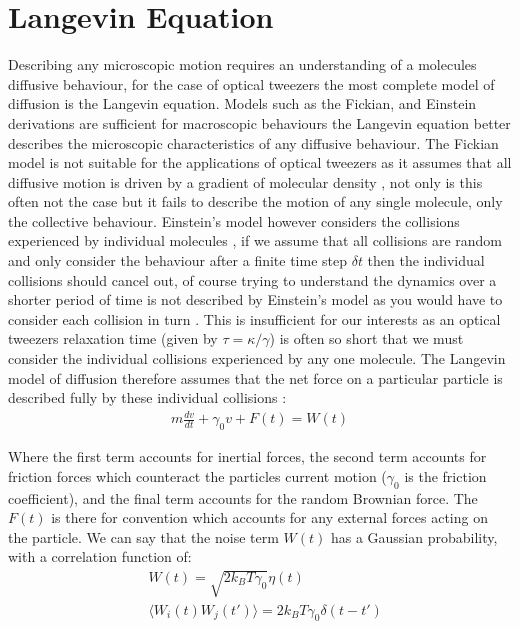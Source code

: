 \section{Langevin Equation}
Describing any microscopic motion requires an understanding of a molecules
diffusive behaviour, for the case of optical tweezers the most complete model 
of diffusion is the Langevin equation. Models such as the Fickian, and Einstein 
derivations are sufficient for macroscopic behaviours the Langevin equation 
better describes the microscopic characteristics of any diffusive behaviour. 
The Fickian model is not suitable for the applications of optical tweezers as 
it assumes that all diffusive motion is driven by a gradient of molecular density
\cite{Gillespie2012}, not only is this often not the case but it fails to describe 
the motion of any single molecule, only the collective behaviour. Einstein's model 
however considers the collisions experienced by individual molecules \cite{Gillespie2012a}, 
if we assume that all collisions are random and only consider the behaviour 
after a finite time step $\delta t$ then the individual collisions should 
cancel out, of course trying to understand the dynamics over a shorter period
of time is not described by Einstein's model as you would have to consider
each collision in turn \cite{Gillespie2012, Gillespie2012}. This is insufficient 
for our interests as an optical tweezers relaxation time (given by 
$\tau = \kappa/\gamma$) is often so short that we must consider the individual 
collisions experienced by any one molecule. The Langevin model of diffusion 
therefore assumes that the net force on a particular particle is described 
fully by these individual collisions \cite{Gillespie2012c}:
\begin{align}
	m\frac{dv}{dt} + \gamma_0 v + F(t) = W(t)
\end{align}

Where the first term accounts for inertial forces, the second term accounts 
for friction forces which counteract the particles current motion ($\gamma_0$ 
is the friction coefficient), and the final term accounts for the random 
Brownian force. The $F(t)$ is there for convention which accounts for any 
external forces acting on the particle. We can say that the noise term 
$W(t)$ has a Gaussian probability, with a correlation function of:
\begin{align}
	&W(t) = \sqrt{2k_BT\gamma_0}\eta(t) \\
	&\langle W_i(t)W_j(t')\rangle = 2k_BT\gamma_0\delta(t-t')
\end{align}

